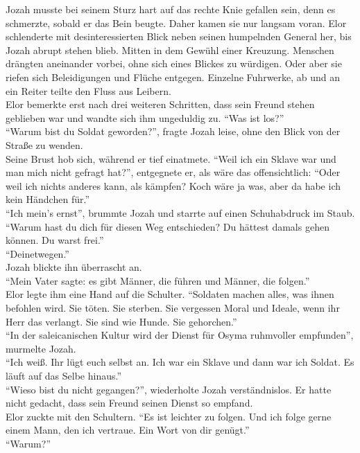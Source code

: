 Jozah musste bei seinem Sturz hart auf das rechte Knie gefallen sein, denn es schmerzte, sobald er 
das Bein beugte. Daher kamen sie nur langsam voran. Elor schlenderte mit desinteressierten Blick 
neben seinen humpelnden General her, bis Jozah abrupt stehen blieb. Mitten in dem Gewühl einer 
Kreuzung. Menschen drängten aneinander vorbei, ohne sich eines Blickes zu würdigen. Oder aber sie 
riefen sich Beleidigungen und Flüche entgegen. Einzelne Fuhrwerke, ab und an ein Reiter teilte den 
Fluss aus Leibern.\\
Elor bemerkte erst nach drei weiteren Schritten, dass sein Freund stehen geblieben war und wandte 
sich ihm ungeduldig zu. ``Was ist los?''\\
``Warum bist du Soldat geworden?'', fragte Jozah leise, ohne den Blick von der Straße zu wenden.\\
Seine Brust hob sich, während er tief einatmete. ``Weil ich ein Sklave war und man mich nicht 
gefragt hat?'', entgegnete er, als wäre das offensichtlich: ``Oder weil ich nichts anderes kann, 
als kämpfen? Koch wäre ja was, aber da habe ich kein Händchen für.''\\
``Ich mein's ernst'', brummte Jozah und starrte auf einen Schuhabdruck im Staub. ``Warum hast du 
dich für diesen Weg entschieden? Du hättest damals gehen können. Du warst frei.''\\
``Deinetwegen.''\\
Jozah blickte ihn überrascht an.\\
``Mein Vater sagte: es gibt Männer, die führen und Männer, die folgen.''\\
Elor legte ihm eine Hand auf die Schulter. ``Soldaten machen alles, was ihnen befohlen wird. Sie 
töten. Sie sterben. Sie vergessen Moral und Ideale, wenn ihr Herr das verlangt. Sie sind wie Hunde. 
Sie gehorchen.''\\
``In der saleicanischen Kultur wird der Dienst für Osyma ruhmvoller empfunden'', murmelte Jozah.\\
``Ich weiß. Ihr lügt euch selbst an. Ich war ein Sklave und dann war ich Soldat. Es läuft auf das 
Selbe hinaus.''\\
``Wieso bist du nicht gegangen?'', wiederholte Jozah verständnislos. Er hatte nicht gedacht, dass 
sein Freund seinen Dienst so empfand.\\
Elor zuckte mit den Schultern. ``Es ist leichter zu folgen. Und ich folge gerne einem Mann, den ich 
vertraue. Ein Wort von dir genügt.''\\
``Warum?''\\
